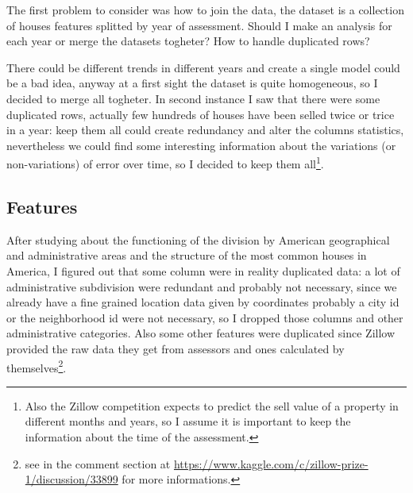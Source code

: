 The first problem to consider was how to join the data, the dataset is a collection of houses features splitted by year of assessment. Should I make an analysis for each year or merge the datasets togheter? How to handle duplicated rows?
    
There could be different trends in different years and create a single model could be a bad idea, anyway at a first sight the dataset is quite homogeneous, so I decided to merge all togheter. In second instance I saw that there were some duplicated rows, actually few hundreds of houses have been selled twice or trice in a year: keep them all could create redundancy and alter the columns statistics, nevertheless we could find some interesting information about the variations (or non-variations) of error over time, so I decided to keep them all\footnote{
    Also the Zillow competition expects to predict the sell value of a property in different months and years, so I assume it is important to keep the information about the time of the assessment.
    }.

\subsection{Features}

After studying about the functioning of the division by American geographical and administrative areas and the structure of the most common houses in America, I figured out that some column were in reality duplicated data: a lot of administrative subdivision were redundant and probably not necessary, since we already have a fine grained location data given by coordinates probably a city id or the neighborhood id were not necessary, so I dropped those columns and other administrative categories. Also some other features were duplicated since Zillow provided the raw data they get from assessors and ones calculated by themselves\footnote{see in the comment section at \url{https://www.kaggle.com/c/zillow-prize-1/discussion/33899} for more informations.}.

